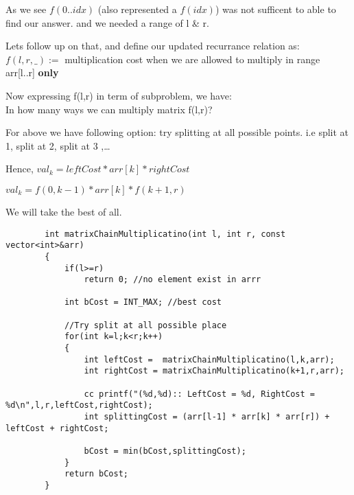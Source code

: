 \vspace{5mm}
\begin{solution}
    
    As we see $f(0..idx)$ (also represented a $f(idx)$) was not sufficent to able to find our answer.
    and we needed a range of l \& r.

    \vspace{2mm}
    Lets follow up on that, and define our updated recurrance relation as:
    $f(l,r,\_):=$ multiplication cost when we are allowed to multiply in range arr[l..r] \textbf{only}

    Now expressing f(l,r) in term of subproblem, we have:\\
    In how many ways we can multiply matrix f(l,r)?

    For above we have following option:
        try splitting at all possible points.
        i.e split at 1, split at 2, split at 3 ,\dots

        Hence,
        $val_k = leftCost * arr[k] * rightCost$

        $val_k = f(0,k-1) * arr[k] * f(k+1,r)$

        We will take the best of all.

\begin{verbatim}
        int matrixChainMultiplicatino(int l, int r, const vector<int>&arr)
        {
            if(l>=r)
                return 0; //no element exist in arrr

            int bCost = INT_MAX; //best cost

            //Try split at all possible place
            for(int k=l;k<r;k++)
            {
                int leftCost =  matrixChainMultiplicatino(l,k,arr);
                int rightCost = matrixChainMultiplicatino(k+1,r,arr);

                cc printf("(%d,%d):: LeftCost = %d, RightCost = %d\n",l,r,leftCost,rightCost);
                int splittingCost = (arr[l-1] * arr[k] * arr[r]) + leftCost + rightCost;

                bCost = min(bCost,splittingCost);
            }
            return bCost;
        }
\end{verbatim}

\end{solution}